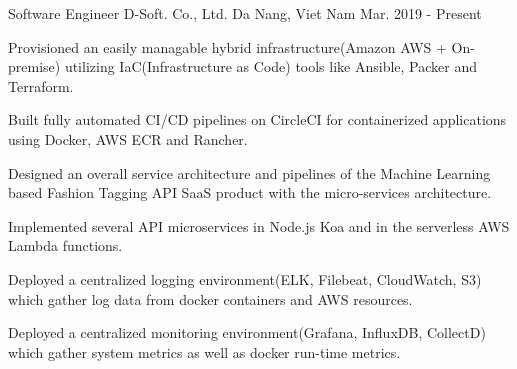 

\begin{cventries}

  \cventry
    {Software Engineer} %
    {D-Soft. Co., Ltd.} %
    {Da Nang, Viet Nam} %
    {Mar. 2019 - Present} %
    {
      \begin{cvitems} %
        \item {Provisioned an easily managable hybrid infrastructure(Amazon AWS + On-premise) utilizing IaC(Infrastructure as Code) tools like Ansible, Packer and Terraform.}
        \item {Built fully automated CI/CD pipelines on CircleCI for containerized applications using Docker, AWS ECR and Rancher.}
        \item {Designed an overall service architecture and pipelines of the Machine Learning based Fashion Tagging API SaaS product with the micro-services architecture.}
        \item {Implemented several API microservices in Node.js Koa and in the serverless AWS Lambda functions.}
        \item {Deployed a centralized logging environment(ELK, Filebeat, CloudWatch, S3) which gather log data from docker containers and AWS resources.}
        \item {Deployed a centralized monitoring environment(Grafana, InfluxDB, CollectD) which gather system metrics as well as docker run-time metrics.}
      \end{cvitems}
    }


\end{cventries}
